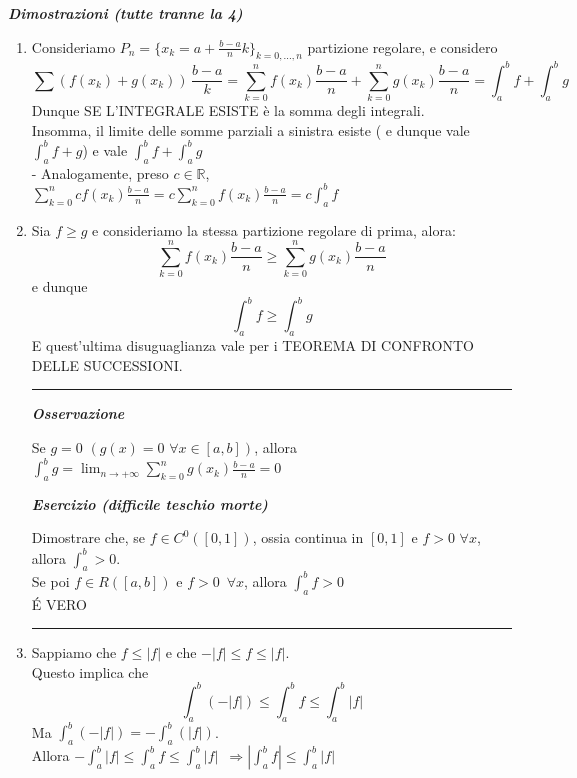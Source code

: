 \documentclass{article}
\theoremstyle{definition}
\newcommand{\R}{\mathbb{R}}
\begin{document}
\begin{center}
    \textbf{\textit{Dimostrazioni (tutte tranne la 4)}}
\end{center}
\begin{enumerate}
    \item Consideriamo $P_n=\{x_k=a+\frac{b-a}{n}k\}_{k=0,...,n}$ partizione regolare, e considero
    \begin{equation*}
        \sum(f(x_k)+g(x_k)) \, \frac{b-a}{k} = \sum_{k=0}^n f(x_k)\frac{b-a}{n}+\sum_{k=0}^n g(x_k)\frac{b-a}{n}=\int_a^b f + \int_a^b g
    \end{equation*}
    Dunque SE L'INTEGRALE ESISTE è la somma degli integrali.
    \\
    Insomma, il limite delle somme parziali a sinistra esiste ( e dunque vale $\int_a^b f+g$) e vale $\int_a^b f + \int_a^b g$
    \\
    - Analogamente, preso $c \in \R$, $\sum_{k=0}^n cf(x_k)\frac{b-a}{n}=c\sum_{k=0}^n f(x_k)\frac{b-a}{n}=c\int_a^b f$
    \item Sia $f \geqslant g $ e consideriamo la stessa partizione regolare di prima, alora:
    \begin{equation*}
        \sum_{k=0}^n f(x_k)\frac{b-a}{n} \geqslant \sum_{k=0}^n g(x_k)\frac{b-a}{n}
    \end{equation*}
    e dunque
    \begin{equation*}
        \int_a^b f \geqslant \int_a^b g
    \end{equation*}
    E quest'ultima disuguaglianza vale per i TEOREMA DI CONFRONTO DELLE SUCCESSIONI.
        \vspace{15pt}
    \hrule
    \vspace{15pt}
\begin{center}
    \textbf{\textit{Osservazione}}
\end{center}
Se $g=0$ $(g(x)=0 \,\, \forall x \in [a,b])$, allora $\int_a^b g = \lim_{n \to +\infty}\sum_{k=0}^n g(x_k) \frac{b-a}{n} =0$

\begin{center}
    \textbf{\textit{Esercizio (difficile teschio morte)}}
\end{center}
Dimostrare che, se $f \in C^0([0,1])$, ossia continua in $[0,1]$ e $f > 0 \,\, \forall x$, allora $\int_a^b > 0$.
\\
Se poi $f \in R([a,b])$ e $f > 0 \,\,\, \forall x$, allora $\int_a^b f > 0$
\\
\'E VERO
    \vspace{15pt}
    \hrule
    \vspace{15pt}
\item Sappiamo che $f \leqslant |f|$ e che $-|f| \leqslant f \leqslant |f|$.
\\
Questo implica che
\begin{equation*}
\int_a^b(-|f|) \leqslant \int_a^b f \leqslant \int_a^b |f|
\end{equation*}
Ma $\int_a^b (-|f|)=-\int_a^b(|f|)$.
\\
Allora $-\int_a^b |f| \leqslant \int_a^b f \leqslant \int_a^b |f| \,\,\, \Longrightarrow |\int_a^b f| \leqslant \int_a^b |f|$
\end{enumerate}
\end{document}
